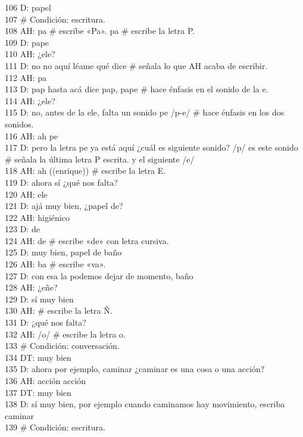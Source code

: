 106 D: papel\\
107 \# Condición: escritura.\\
108 AH: pa \# escribe «Pa». pa \# escribe la letra P.\\
109 D: pape\\
110 AH: ¿ele?\\
111 D: no no aquí léame qué dice \# señala lo que AH acaba de escribir.\\
112 AH: pa\\
113 D: pap hasta acá dice pap, pape \# hace énfasis en el sonido de la e.\\
114 AH: ¿ele?\\
115 D: no, antes de la ele, falta un sonido pe /p-e/ \# hace énfasis en los dos sonidos.\\
116 AH: ah pe\\
117 D: pero la letra pe ya está aquí ¿cuál es siguiente sonido? /p/ es este sonido \# señala la última letra P escrita. y el siguiente /e/\\
118 AH: ah ((enrique)) \# escribe la letra E.\\
119 D: ahora sí ¿qué nos falta?\\
120 AH: ele\\
121 D: ajá muy bien, ¿papel de?\\
122 AH: higiénico\\
123 D: de\\
124 AH: de \# escribe «de» con letra cursiva.\\
125 D: muy bien, papel de baño\\
126 AH: ba \# escribe «va».\\
127 D: con esa la podemos dejar de momento, baño\\
128 AH: ¿eñe?\\
129 D: sí muy bien\\
130 AH: \# escribe la letra Ñ.\\
131 D: ¿qué nos falta?\\
132 AH: /o/ \# escribe la letra o.\\
133 \# Condición: conversación.\\
134 DT: muy bien\\
135 D: ahora por ejemplo, caminar ¿caminar es una cosa o una acción?\\
136 AH: acción acción\\
137 DT: muy bien\\
138 D: sí muy bien, por ejemplo cuando caminamos hay movimiento, escriba caminar\\
139 \# Condición: escritura.\\
